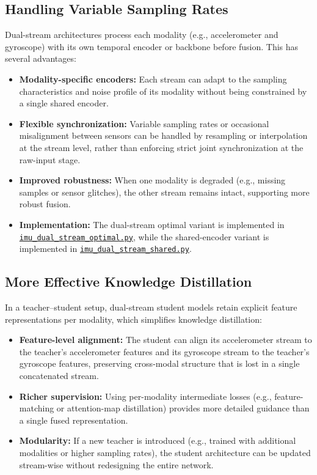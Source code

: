 \subsection{Handling Variable Sampling Rates}

Dual-stream architectures process each modality (e.g., accelerometer and gyroscope) with its own temporal encoder or backbone before fusion. This has several advantages:
\begin{itemize}
    \item \textbf{Modality-specific encoders:} Each stream can adapt to the sampling characteristics and noise profile of its modality without being constrained by a single shared encoder.
    \item \textbf{Flexible synchronization:} Variable sampling rates or occasional misalignment between sensors can be handled by resampling or interpolation at the stream level, rather than enforcing strict joint synchronization at the raw-input stage.
    \item \textbf{Improved robustness:} When one modality is degraded (e.g., missing samples or sensor glitches), the other stream remains intact, supporting more robust fusion.
    \item \textbf{Implementation:} The dual-stream optimal variant is implemented in
    \href{https://github.com/lolout1/FeatureKD/blob/main/Models/imu_dual_stream_optimal.py}{\texttt{imu\_dual\_stream\_optimal.py}},
    while the shared-encoder variant is implemented in
    \href{https://github.com/lolout1/FeatureKD/blob/main/Models/imu_dual_stream_shared.py}{\texttt{imu\_dual\_stream\_shared.py}}.
\end{itemize}

\subsection{More Effective Knowledge Distillation}

In a teacher--student setup, dual-stream student models retain explicit feature representations per modality, which simplifies knowledge distillation:
\begin{itemize}
    \item \textbf{Feature-level alignment:} The student can align its accelerometer stream to the teacher's accelerometer features and its gyroscope stream to the teacher's gyroscope features, preserving cross-modal structure that is lost in a single concatenated stream.
    \item \textbf{Richer supervision:} Using per-modality intermediate losses (e.g., feature-matching or attention-map distillation) provides more detailed guidance than a single fused representation.
    \item \textbf{Modularity:} If a new teacher is introduced (e.g., trained with additional modalities or higher sampling rates), the student architecture can be updated stream-wise without redesigning the entire network.
\end{itemize}

